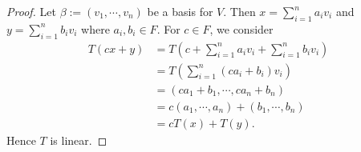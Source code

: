 \begin{Exercise}
\begin{proof}
Let $\beta := (v_1,\cdots, v_n)$ be a basis for $V$. Then $x = \sum_{i=1}^{n} a_i v_i$ and $y = \sum_{i=1}^{n} b_i v_i$ where $a_i, b_i \in F$. For $c\in F$, we consider
\begin{align*}
T(c x+y)
&= T\left(c+\sum_{i=1}^{n} a_i v_i + \sum_{i=1}^{n} b_i v_i \right) \\
&= T\left(\sum_{i=1}^{n} (c a_i + b_i)v_i \right) \\
&= (c a_1 + b_1, \cdots, c a_n + b_n) \\
&= c (a_1,\cdots, a_n) + (b_1,\cdots, b_n) \\
&= c T(x) + T(y).
\end{align*}
Hence $T$ is linear.
\end{proof}
\end{Exercise}